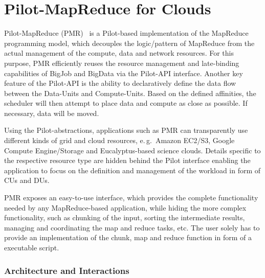 \documentclass[times]{cpeauth}
\newcommand{\pilot}{Pilot\xspace}
\newcommand{\computeunits}{Compute-Units\xspace}
\newcommand{\dataunits}{Data-Units\xspace}
\newcommand{\dus}{DUs\xspace}
\newcommand{\cus}{CUs\xspace}
\begin{document}
\section{Pilot-MapReduce for Clouds}
\label{sec:pmr}

Pilot-MapReduce (PMR)~\cite{Mantha:2012:PEF:2287016.2287020} is a \pilot-based
implementation of the MapReduce programming model, which decouples the
logic/pattern of MapReduce from the actual management of the compute, data and
network resources. For this purpose, PMR efficiently reuses the resource
management and late-binding capabilities of BigJob and BigData via the 
\pilot-API interface. Another key feature of the \pilot-API is the ability to 
declaratively define the data flow between the \dataunits and \computeunits. 
Based on the defined affinities, the scheduler will then attempt to place data 
and compute as close as possible. If necessary, data will be moved. 

Using the \pilot-abstractions, applications such as PMR can transparently use
different kinds of grid and cloud resources, e.\,g.\ Amazon EC2/S3, Google
Compute Engine/Storage and Eucalyptus-based science clouds. Details specific
to the respective resource type are hidden behind the \pilot interface
enabling the application to focus on the definition and management of the
workload in form of \cus and \dus.

PMR exposes an easy-to-use interface, which provides the complete
functionality needed by any MapReduce-based application, while hiding the more
complex functionality, such as chunking of the input, sorting the intermediate
results, managing and coordinating the map and reduce tasks, etc. The user
solely has to provide an implementation of the chunk, map and reduce function
in form of a executable script.

\subsubsection*{Architecture and Interactions}
\end{document}
